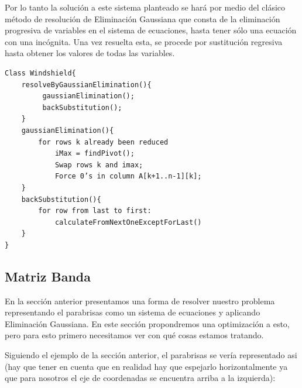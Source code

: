 \newpage

Por lo tanto la solución a este sistema planteado se hará por medio del clásico método de resolución de Eliminación Gaussiana que consta de la eliminación progresiva de variables en el sistema de ecuaciones, hasta tener sólo una ecuación con una incógnita. Una vez resuelta esta, se procede por sustitución regresiva hasta obtener los valores de todas las variables.

\begin{verbatim}
Class Windshield{
    resolveByGaussianElimination(){
         gaussianElimination();
         backSubstitution();
    } 
    gaussianElimination(){
        for rows k already been reduced
            iMax = findPivot();
            Swap rows k and imax;
            Force 0’s in column A[k+1..n-1][k];
    }
    backSubstitution(){
        for row from last to first:
            calculateFromNextOneExceptForLast()
    }
}
\end{verbatim}

\subsection{Matriz Banda}

En la sección anterior presentamos una forma de resolver nuestro problema representando el parabrisas como un sistema de ecuaciones y aplicando Eliminación Gaussiana. En este sección propondremos una optimización a esto, pero para esto primero necesitamos ver con qué cosas estamos tratando.

Siguiendo el ejemplo de la sección anterior, el parabrisas se vería representado asi (hay que tener en cuenta que en realidad hay que espejarlo horizontalmente ya que para nosotros el eje de coordenadas se encuentra arriba a la izquierda):

